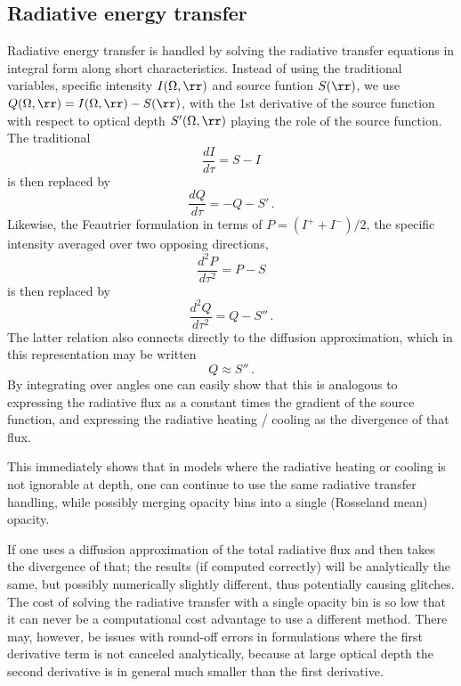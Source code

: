 \documentclass[paper=a4,fontsize=11pt]{scrartcl}
\numberwithin{equation}{section}		%
\numberwithin{figure}{section}			%
\numberwithin{table}{section}				%
\begin{document}
\subsection{Radiative energy transfer}
Radiative energy transfer is handled by solving the radiative transfer equations in integral form along short characteristics.  Instead of using the traditional variables, specific intensity $I(\Omega,\rr)$ and source funtion $S(\rr)$, we use $Q(\Omega,\rr) = I(\Omega,\rr)-S(\rr)$, with the 1st derivative of the source function with respect to optical depth $S'(\Omega,\rr)$ playing the role of the source function.   The traditional
\begin{equation}
    \frac{dI}{d\tau} = S-I
\end{equation}
is then replaced by
\begin{equation}
    \frac{dQ}{d\tau} = -Q - S' \,.
\end{equation}
Likewise, the Feautrier formulation in terms of $P = (I^+ + I^-)/2$, the specific intensity averaged over two opposing directions,
\begin{equation}
    \frac{d^2P}{d\tau^2} = P - S
\end{equation}
is then replaced by
\begin{equation}
    \frac{d^2 Q}{d\tau^2} = Q - S'' \,.
\end{equation}
The latter relation also connects directly to the diffusion approximation, which in this representation may be written
\begin{equation}
    Q \approx S'' \,.
\end{equation}
By integrating over angles one can easily show that this is analogous to expressing the radiative flux as a constant times the gradient of the source function, and expressing the radiative heating / cooling as the divergence of that flux.

This immediately shows that in models where the radiative heating or cooling is not ignorable at depth, one can continue to use the same radiative transfer handling, while possibly merging opacity bins into a single (Rosseland mean) opacity.  

If one uses a diffusion approximation of the total radiative flux and then takes the divergence of that; the results (if computed correctly) will be analytically the same, but possibly numerically slightly different, thus potentially causing glitches.   The cost of solving the radiative transfer with a single opacity bin is so low that it can never be a computational cost advantage to use a different method. There may, however, be issues with round-off errors in formulations where the first derivative term is not canceled analytically, because at large optical depth the second  derivative is in general much smaller than the first derivative.
\end{document}
